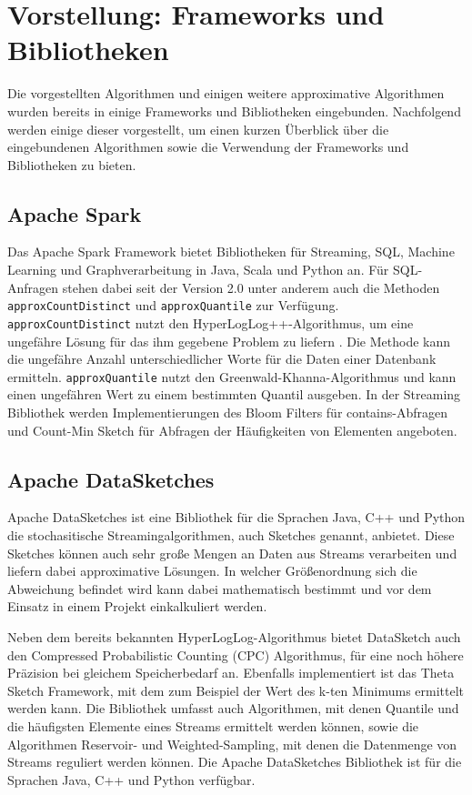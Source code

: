 \section{Vorstellung: Frameworks und Bibliotheken}
Die vorgestellten Algorithmen und einigen weitere approximative Algorithmen wurden bereits in einige Frameworks und Bibliotheken eingebunden. Nachfolgend werden einige dieser vorgestellt, um einen kurzen Überblick über die eingebundenen Algorithmen sowie die Verwendung der Frameworks und Bibliotheken zu bieten.

\subsection{Apache Spark}
Das Apache Spark Framework bietet Bibliotheken für Streaming, SQL, Machine Learning und Graphverarbeitung in Java, Scala und Python an. 
Für SQL-Anfragen stehen dabei seit der Version 2.0 unter anderem auch die Methoden \texttt{approxCountDistinct} 
und \texttt{approxQuantile} zur Verfügung. 
\texttt{approxCountDistinct} nutzt den Hyper\-LogLog++-Algorithmus, 
um eine ungefähre Lösung für das ihm gegebene Problem zu liefern \cite{hunter2016}.
Die Methode kann die ungefähre Anzahl unterschiedlicher Worte für die Daten einer Datenbank ermitteln.
\texttt{approxQuantile} nutzt den Greenwald-Khanna-Algorithmus \cite{greenwald2001} 
und kann einen ungefähren Wert zu einem bestimmten Quantil ausgeben.
In der Streaming Bibliothek werden Implementierungen des Bloom Filters für contains-Abfragen und Count-Min Sketch für Abfragen der Häufigkeiten von Elementen angeboten.


\subsection{Apache DataSketches}
Apache DataSketches ist eine Bibliothek für die Sprachen Java, C++ und Python die stochasitische Streamingalgorithmen, 
auch Sketches genannt, anbietet. 
Diese Sketches können auch sehr große Mengen an Daten aus Streams verarbeiten 
und liefern dabei approximative Lösungen. 
In welcher Größenordnung sich die Abweichung befindet wird kann dabei mathematisch bestimmt 
und vor dem Einsatz in einem Projekt einkalkuliert werden.

Neben dem bereits bekannten HyperLogLog-Algorithmus bietet DataSketch auch den Compressed Probabilistic Counting (CPC) Algorithmus, 
für eine noch höhere Präzision bei gleichem Speicherbedarf an.
Ebenfalls implementiert ist das Theta Sketch Framework, 
mit dem zum Beispiel der Wert des k-ten Minimums ermittelt werden kann.
Die Bibliothek umfasst auch Algorithmen, mit denen Quantile und die häufigsten Elemente eines Streams ermittelt werden können, 
sowie die Algorithmen Reservoir- und Weighted-Sampling, mit denen die Datenmenge von Streams reguliert werden können.
Die Apache DataSketches Bibliothek ist für die Sprachen Java, C++ und Python verfügbar.

